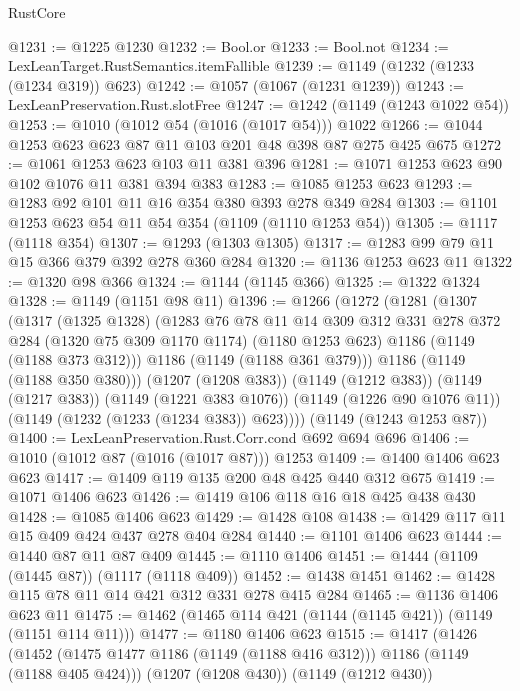 \begin{lexlean}{RustCore}
\begin{coremodule}
@1231 := @1225 @1230
@1232 := Bool.or
@1233 := Bool.not
@1234 := LexLeanTarget.RustSemantics.itemFallible
@1239 := @1149 (@1232 (@1233 (@1234 @319)) @623)
@1242 := @1057 (@1067 (@1231 @1239))
@1243 := LexLeanPreservation.Rust.slotFree
@1247 := @1242 (@1149 (@1243 @1022 @54))
@1253 := @1010 (@1012 @54 (@1016 (@1017 @54))) @1022
@1266 := @1044 @1253 @623 @623 @87 @11 @103 @201 @48 @398 @87 @275 @425 @675
@1272 := @1061 @1253 @623 @103 @11 @381 @396
@1281 := @1071 @1253 @623 @90 @102 @1076 @11 @381 @394 @383
@1283 := @1085 @1253 @623
@1293 := @1283 @92 @101 @11 @16 @354 @380 @393 @278 @349 @284
@1303 := @1101 @1253 @623 @54 @11 @54 @354 (@1109 (@1110 @1253 @54))
@1305 := @1117 (@1118 @354)
@1307 := @1293 (@1303 @1305)
@1317 := @1283 @99 @79 @11 @15 @366 @379 @392 @278 @360 @284
@1320 := @1136 @1253 @623 @11
@1322 := @1320 @98 @366
@1324 := @1144 (@1145 @366)
@1325 := @1322 @1324
@1328 := @1149 (@1151 @98 @11)
@1396 := @1266
    (@1272
      (@1281
        (@1307
          (@1317
            (@1325 @1328)
            (@1283
              @76
              @78
              @11
              @14
              @309
              @312
              @331
              @278
              @372
              @284
              (@1320 @75 @309 @1170 @1174)
              (@1180 @1253 @623)
              @1186
              (@1149 (@1188 @373 @312)))
            @1186
            (@1149 (@1188 @361 @379)))
          @1186
          (@1149 (@1188 @350 @380)))
        (@1207 (@1208 @383))
        (@1149 (@1212 @383))
        (@1149 (@1217 @383))
        (@1149 (@1221 @383 @1076))
        (@1149 (@1226 @90 @1076 @11))
        (@1149 (@1232 (@1233 (@1234 @383)) @623))))
    (@1149 (@1243 @1253 @87))
@1400 := LexLeanPreservation.Rust.Corr.cond @692 @694 @696
@1406 := @1010 (@1012 @87 (@1016 (@1017 @87))) @1253
@1409 := @1400 @1406 @623 @623
@1417 := @1409 @119 @135 @200 @48 @425 @440 @312 @675
@1419 := @1071 @1406 @623
@1426 := @1419 @106 @118 @16 @18 @425 @438 @430
@1428 := @1085 @1406 @623
@1429 := @1428 @108
@1438 := @1429 @117 @11 @15 @409 @424 @437 @278 @404 @284
@1440 := @1101 @1406 @623
@1444 := @1440 @87 @11 @87 @409
@1445 := @1110 @1406
@1451 := @1444 (@1109 (@1445 @87)) (@1117 (@1118 @409))
@1452 := @1438 @1451
@1462 := @1428 @115 @78 @11 @14 @421 @312 @331 @278 @415 @284
@1465 := @1136 @1406 @623 @11
@1475 := @1462 (@1465 @114 @421 (@1144 (@1145 @421)) (@1149 (@1151 @114 @11)))
@1477 := @1180 @1406 @623
@1515 := @1417
    (@1426
      (@1452 (@1475 @1477 @1186 (@1149 (@1188 @416 @312))) @1186 (@1149 (@1188 @405 @424)))
      (@1207 (@1208 @430))
      (@1149 (@1212 @430))

\end{coremodule}
\end{lexlean}
